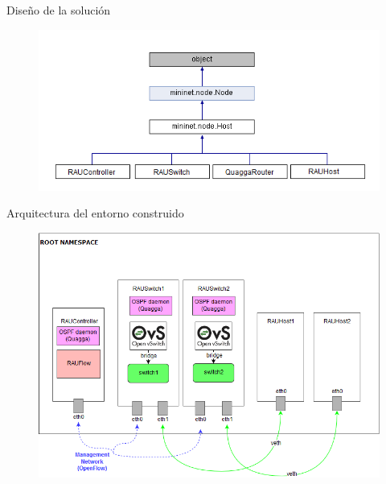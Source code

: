 \documentclass[xcolor=svgnames]{beamer}
\begin{document}
\begin{frame}{Diseño de la solución}
	\begin{figure}[t]
		\centering
		\includegraphics[scale=0.7]{clases_entorno}
	\end{figure}
\end{frame}

\begin{frame}{Arquitectura del entorno construido}
	\begin{figure}[t]
		\centering
		\includegraphics[scale=0.5]{emulator_architecture}
	\end{figure}
\end{frame}
\end{document}
